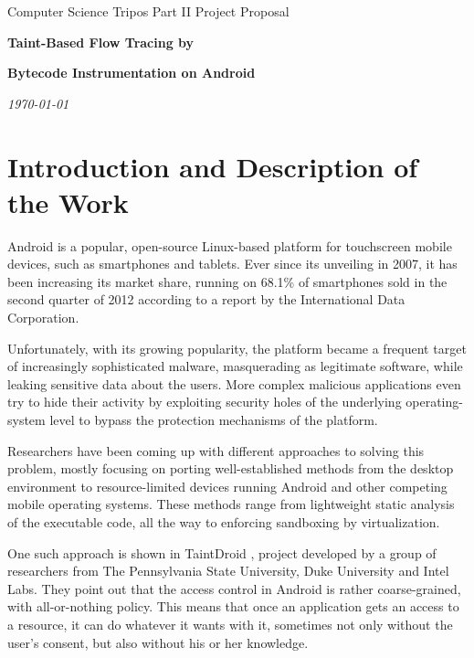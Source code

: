 \documentclass[12pt]{article}
\begin{document}
\thispagestyle{empty}

\medskip
{}
\medskip
{}

\vspace{0.3in}
\centerline{\large Computer Science Tripos Part II Project Proposal}
\vspace{0.4in}
\centerline{\Large\bf Taint-Based Flow Tracing by}
\vspace{0.1in}
\centerline{\Large\bf Bytecode Instrumentation on Android}
\vspace{0.3in}
\cleanlookdateon
\centerline{\large \emph \today}
\vspace{0.5in}

\section*{Introduction and Description of the Work}

Android is a popular, open-source Linux-based platform for touchscreen
mobile devices, such as smartphones and tablets. Ever since its unveiling 
in 2007, it has been increasing its market share, running on 68.1\% of 
smartphones sold in the second quarter of 2012 according to a report by 
the International Data Corporation. 
\cite{www.idc.com/getdoc.jsp?containerId=prUS23638712}

Unfortunately, with its growing popularity, the platform became a frequent
target of increasingly sophisticated malware, masquerading as legitimate
software, while leaking sensitive data about the users. More complex
malicious applications even try to hide their activity by exploiting 
security holes of the underlying operating-system level to bypass the 
protection mechanisms of the platform.

Researchers have been coming up with different approaches to solving
this problem, mostly focusing on porting well-established methods from
the desktop environment to resource-limited devices running Android and
other competing mobile operating systems. These methods range from 
lightweight static analysis of the executable code, all the way to 
enforcing sandboxing by virtualization. 

One such approach is shown in TaintDroid \cite{www.appanalysis.org}, 
project developed by a group of researchers from The Pennsylvania State
University, Duke University and Intel Labs. They point out that the
access control in Android is rather coarse-grained, with all-or-nothing
policy. This means that once an application gets an access to a resource,
it can do whatever it wants with it, sometimes not only without the 
user's consent, but also without his or her knowledge.
\end{document}
